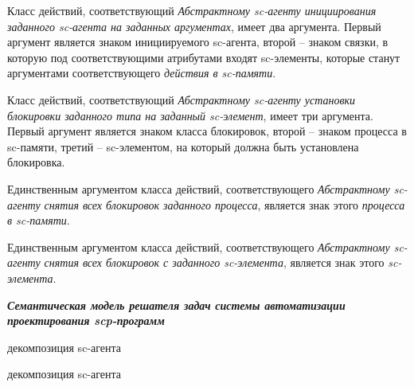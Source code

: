 Класс действий, соответствующий \textit{Абстрактному sc-агенту инициирования заданного sc-агента на заданных аргументах}, имеет два аргумента. Первый аргумент является знаком инициируемого sc-агента, второй -- знаком связки, в которую под соответствующими атрибутами входят sc-элементы, которые станут аргументами соответствующего \textit{действия в sc-памяти}.

Класс действий, соответствующий \textit{Абстрактному sc-агенту установки блокировки заданного типа на заданный sc-элемент}, имеет три аргумента. Первый аргумент является знаком класса блокировок, второй -- знаком процесса в sc-памяти, третий -- sc-элементом, на который должна быть установлена блокировка.

Единственным аргументом класса действий, соответствующего \textit{Абстрактному sc-агенту снятия всех блокировок заданного процесса}, является знак этого \textit{процесса в sc-памяти}.

Единственным аргументом класса действий, соответствующего \textit{Абстрактному sc-агенту снятия всех блокировок с заданного sc-элемента}, является знак этого \textit{sc-элемента}.


\textit{\textbf{Семантическая модель решателя задач системы автоматизации проектирования scp-программ}}

\begin{SCn}
\begin{scnreltoset}{декомпозиция sc-агента}
    \begin{scnindent}
        \begin{scnreltoset}{декомпозиция sc-агента}
        \end{scnreltoset}
    \end{scnindent}
\end{scnreltoset}
\end{SCn}

